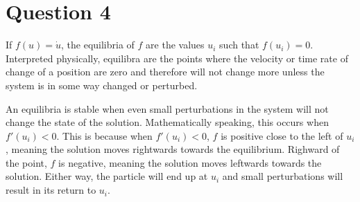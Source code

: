 \documentclass[12pt,a4paper]{article}
\begin{document}
\section{Question 4}

If $f(u) = \dot{u}$, the equilibria of $f$ are the values $u_i$ such that $f(u_i) = 0$. Interpreted physically, equilibra are the points where the velocity or time rate of change of a position are zero and therefore will not change more unless the system is in some way changed or perturbed.

An equilibria is stable when even small perturbations in the system will not change the state of the solution. Mathematically speaking, this occurs when $f'(u_i) < 0$. This is because when $f'(u_i) < 0$, $f$ is positive close to the left of $u_i$, meaning the solution moves rightwards towards the equilibrium. Righward of the point, $f$ is negative, meaning the solution moves leftwards towards the solution. Either way, the particle will end up at $u_i$ and small perturbations will result in its return to $u_i$.
\end{document}
